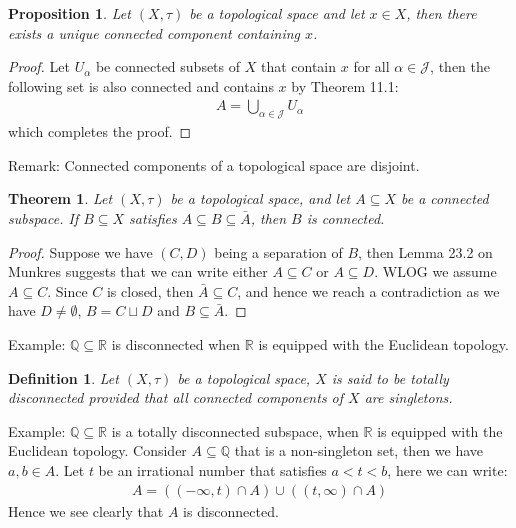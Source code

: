 \documentclass[11pt]{book}
\theoremstyle{break}
\theoremstyle{break}
\newtheorem{thm}{Theorem}[section]
\newtheorem{prop}[lem]{Proposition}
\newtheorem{defn}{Definition}[corL]
\newcommand{\R}{\mathbb{R}}
\newcommand{\Q}{\mathbb{Q}}
\newcommand{\remark}{\color{blue}Remark: \color{black}}
\newcommand{\example}{\color{green}Example: \color{black}}
\begin{document}
\begin{prop}
Let $(X,\tau)$ be a topological space and let $x \in X$, then there exists a unique connected component containing $x$. 
\end{prop}
\begin{proof}
Let $U_\alpha$ be connected subsets of $X$ that contain $x$ for all $\alpha \in \mathcal{J}$, then the following set is also connected and contains $x$ by Theorem 11.1:
\begin{align*}
A = \bigcup_{\alpha \in \mathcal{J}}U_\alpha
\end{align*} 
which completes the proof. 
\end{proof}

\remark Connected components of a topological space are disjoint. 

\begin{thm}
Let $(X,\tau)$ be a topological space, and let $A\subseteq X$ be a connected subspace. If $B \subseteq X$ satisfies $A \subseteq B \subseteq \bar{A}$, then $B$ is connected.
\end{thm}
\begin{proof}
Suppose we have $(C,D)$ being a separation of $B$, then Lemma 23.2 on Munkres suggests that we can write either $A \subseteq C$ or $A \subseteq D$. WLOG we assume $A\subseteq C$. Since $C$ is closed, then $\bar{A}\subseteq C$, and hence we reach a contradiction as we have $D\neq \emptyset$, $B = C\sqcup D$ and $B\subseteq \bar{A}$. 
\end{proof}


\example $\Q \subseteq \R$ is disconnected when $\R$ is equipped with the Euclidean topology.


\begin{defn}
Let $(X,\tau)$ be a topological space, $X $ is said to be totally disconnected provided that all connected components of $X$ are singletons. 
\end{defn}

\example $\Q\subseteq \R$ is a totally disconnected subspace, when $\R$ is equipped with the Euclidean topology. Consider $A \subseteq \Q$ that is a non-singleton set, then we have $a,b \in A$. Let $t$ be an irrational number that satisfies $a<t<b$, here we can write:
\begin{align*}
A = ((-\infty, t)\cap A)\cup ((t,\infty) \cap A)
\end{align*}
Hence we see clearly that $A$ is disconnected.\\
\end{document}
